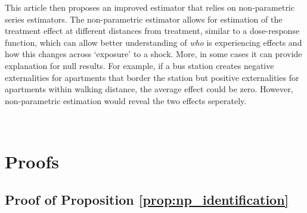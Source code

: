 \documentclass[10pt]{article}
\begin{document}
This article then proposes an improved estimator that relies on non-parametric series estimators. The non-parametric estimator allows for estimation of the treatment effect at different distances from treatment, similar to a dose-response function, which can allow better understanding of \emph{who} is experiencing effects and how this changes across `exposure' to a shock. More, in some cases it can provide explanation for null results. For example, if a bus station creates negative externalities for apartments that border the station but positive externalities for apartments within walking distance, the average effect could be zero. However, non-parametric estimation would reveal the two effects seperately.


\newpage~

\appendix 

\section{Proofs}
\label{sec:proofs}

\subsection{Proof of Proposition \ref{prop:np_identification}}
\end{document}
